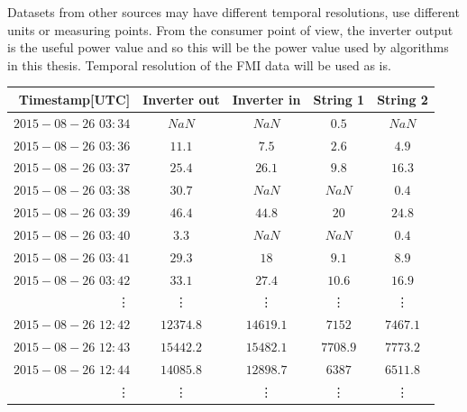 Datasets from other sources may have different temporal resolutions, use different units or measuring points. From the consumer point of view, the inverter output is the useful power value and so this will be the power value used by algorithms in this thesis. Temporal resolution of the FMI data will be used as is.


\begin{table}[h]

\centering

\begin{tabular}{r|cccc} \hline\hline

Timestamp[UTC] & Inverter out & Inverter in & String 1 & String 2\\ \hline
$2015-08-26$ $03:34$ & $NaN$ & $NaN$ & $0.5$ & $NaN$\\
$2015-08-26$ $03:36$ & $11.1$ & $7.5$ & $2.6$ & $4.9$\\
$2015-08-26$ $03:37$ & $25.4$ & $26.1$ & $9.8$ & $16.3$\\
$2015-08-26$ $03:38$ & $30.7$& $NaN$ & $NaN$ & $0.4$\\
$2015-08-26$ $03:39$ & $46.4$& $44.8$ & $20$ & $24.8$\\
$2015-08-26$ $03:40$ & $3.3$ & $NaN$ & $NaN$ & $0.4$\\
$2015-08-26$ $03:41$ & $29.3$ &  $18$ & $9.1$ & $8.9$\\
$2015-08-26$ $03:42$ & $33.1$& $27.4$ & $10.6$ & $16.9$\\

\vdots & \vdots & \vdots & \vdots & \vdots\\
$2015-08-26$ $12:42$ & $12374.8$ & $14619.1$ & $7152$ & $7467.1$\\
$2015-08-26$ $12:43$ & $15442.2$ & $15482.1 $& $7708.9$ & $7773.2$\\
$2015-08-26$ $12:44$ & $14085.8$ & $12898.7$ & $6387$ & $6511.8$ \\
\vdots & \vdots & \vdots & \vdots & \vdots\\

\hline\hline
\end{tabular}

\label{table_fmi_kumpula_csv}
\end{table}





